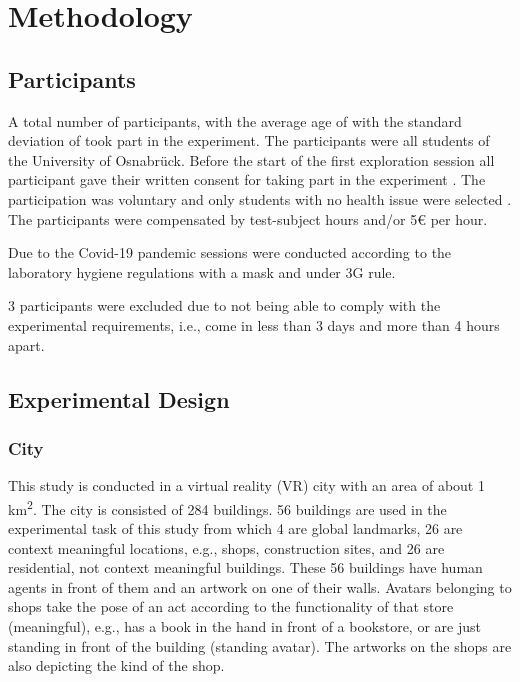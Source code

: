 \chapter{Methodology}

\section{Participants}

A total number of  participants,  with the average age of  with the standard deviation of  took part in the experiment. The participants were all students of the University of Osnabrück. Before the start of the first exploration session all participant gave their written consent for taking part in the experiment . The participation was voluntary and only students with no health issue were selected . The participants were compensated by test-subject hours and/or 5€ per hour.  

Due to the Covid-19 pandemic sessions were conducted according to the laboratory hygiene regulations with a mask and under 3G rule.

3 participants were excluded due to not being able to comply with the experimental requirements, i.e., come in less than 3 days and more than 4 hours apart.



\section{Experimental Design}


\subsection{City}

This study is conducted in a virtual reality (VR) city with an area of about 1 km\textsuperscript2. The city is consisted of 284 buildings. 56 buildings are used in the experimental task of this study from which 4 are global landmarks, 26 are {\emphasize context meaningful} locations, e.g., shops, construction sites, and 26 are residential, {\emphasize not context meaningful} buildings. These 56 buildings have human agents in front of them and an artwork on one of their walls. Avatars belonging to shops take the pose of an act according to the functionality of that store {\emphasize(meaningful)}, e.g., has a book in the hand in front of a bookstore, or are just standing in front of the building {\emphasize(standing avatar)}. The artworks on the shops are also depicting the kind of the shop.

